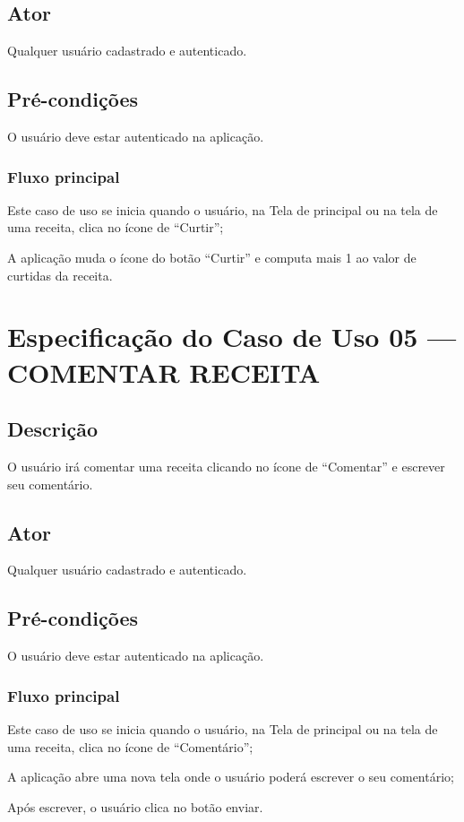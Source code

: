 \subsection*{Ator}
Qualquer usuário cadastrado e autenticado.

\subsection*{Pré-condições}
O usuário deve estar autenticado na aplicação. 

\subsubsection*{Fluxo principal}
\begin{lista}
	\item Este caso de uso se inicia quando o usuário, na Tela de principal ou na tela de uma receita, clica no ícone de “Curtir”; 
	\item A aplicação muda o ícone do botão “Curtir” e computa mais 1 ao valor de curtidas da receita.	
\end{lista}
\pagebreak


\section*{Especificação do Caso de Uso 05 --- COMENTAR RECEITA}
\subsection*{Descrição}
O usuário irá comentar uma receita clicando no ícone de “Comentar” e escrever seu comentário.

\subsection*{Ator}
Qualquer usuário cadastrado e autenticado.

\subsection*{Pré-condições}
O usuário deve estar autenticado na aplicação. 

\subsubsection*{Fluxo principal}
\begin{lista}
	\item Este caso de uso se inicia quando o usuário, na Tela de principal ou na tela de uma receita, clica no ícone de “Comentário”;
	\item A aplicação abre uma nova tela onde o usuário poderá escrever o seu comentário;
	\item Após escrever, o usuário clica no botão enviar.
\end{lista}
\pagebreak


